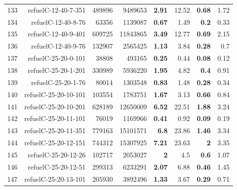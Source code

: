 \begin{longtable}{lrr@{\hskip 12pt}r@{\hskip 12pt}r@{\hskip 12pt}r@{\hskip 12pt}r@{\hskip 12pt}r}
133 & \multirow{1}{*}{refuelC-12-40-7-351} & \multirow{1}{*}{489896} & \multirow{1}{*}{9489653} & \textbf{2.91} & 12.52 & \textbf{0.68} & 1.72 \\
134 & \multirow{1}{*}{refuelC-12-40-8-76} & \multirow{1}{*}{63356} & \multirow{1}{*}{1139087} & \textbf{0.67} & 1.49 & \textbf{0.2} & 0.33 \\
135 & \multirow{1}{*}{refuelC-12-40-9-401} & \multirow{1}{*}{609725} & \multirow{1}{*}{11843865} & \textbf{3.49} & 12.77 & \textbf{0.69} & 2.15 \\
136 & \multirow{1}{*}{refuelC-12-40-9-76} & \multirow{1}{*}{132907} & \multirow{1}{*}{2565425} & \textbf{1.13} & 3.84 & \textbf{0.28} & 0.7 \\
137 & \multirow{1}{*}{refuelC-25-20-0-101} & \multirow{1}{*}{38808} & \multirow{1}{*}{493165} & \textbf{0.25} & 0.44 & \textbf{0.08} & 0.12 \\
138 & \multirow{1}{*}{refuelC-25-20-1-201} & \multirow{1}{*}{330989} & \multirow{1}{*}{5936220} & \textbf{1.95} & 4.82 & \textbf{0.4} & 0.91 \\
139 & \multirow{1}{*}{refuelC-25-20-1-76} & \multirow{1}{*}{80014} & \multirow{1}{*}{1303548} & \textbf{0.83} & 1.48 & \textbf{0.28} & 0.34 \\
140 & \multirow{1}{*}{refuelC-25-20-10-101} & \multirow{1}{*}{103554} & \multirow{1}{*}{1783751} & \textbf{1.67} & 3.13 & \textbf{0.66} & 0.84 \\
141 & \multirow{1}{*}{refuelC-25-20-10-201} & \multirow{1}{*}{628189} & \multirow{1}{*}{12650009} & \textbf{6.52} & 22.51 & \textbf{1.88} & 3.24 \\
142 & \multirow{1}{*}{refuelC-25-20-11-101} & \multirow{1}{*}{76019} & \multirow{1}{*}{1169966} & \textbf{0.41} & 0.92 & \textbf{0.09} & 0.19 \\
143 & \multirow{1}{*}{refuelC-25-20-11-351} & \multirow{1}{*}{779163} & \multirow{1}{*}{15101571} & \textbf{6.8} & 23.86 & \textbf{1.46} & 3.34 \\
144 & \multirow{1}{*}{refuelC-25-20-12-151} & \multirow{1}{*}{744312} & \multirow{1}{*}{15307925} & \textbf{7.21} & 23.63 & \textbf{2} & 3.35 \\
145 & \multirow{1}{*}{refuelC-25-20-12-26} & \multirow{1}{*}{102717} & \multirow{1}{*}{2053027} & \textbf{2} & 4.5 & \textbf{0.6} & 1.07 \\
146 & \multirow{1}{*}{refuelC-25-20-12-51} & \multirow{1}{*}{299313} & \multirow{1}{*}{6233291} & \textbf{2.07} & 6.88 & \textbf{0.46} & 1.45 \\
147 & \multirow{1}{*}{refuelC-25-20-13-101} & \multirow{1}{*}{205930} & \multirow{1}{*}{3892496} & \textbf{1.33} & 3.67 & \textbf{0.29} & 0.71 \\

\end{longtable}
